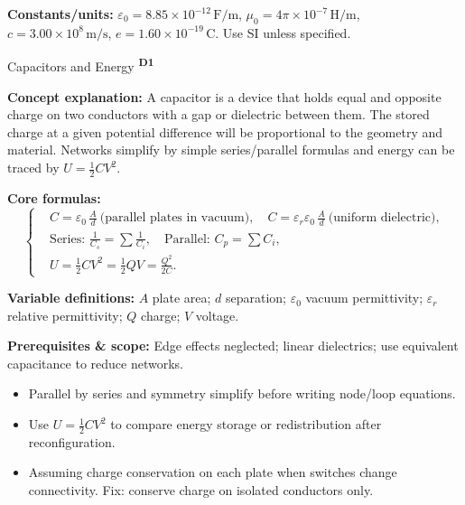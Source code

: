﻿\documentclass[12pt,a4paper]{article}
\providecommand{\KPFormulas}{}
\providecommand{\KPHeuristics}{}
\newcommand{\DOne}{\texorpdfstring{\textsuperscript{\textbf{D1}}}{ D1}}
\begin{document}
\begin{insightbox}
\textbf{Constants/units:} $\varepsilon_0=8.85\times10^{-12}\,\mathrm{F/m}$, $\mu_0=4\pi\times10^{-7}\,\mathrm{H/m}$, $c=3.00\times10^8\,\mathrm{m/s}$, $e=1.60\times10^{-19}\,\mathrm{C}$. Use SI unless specified.
\end{insightbox}


\begin{KnowledgePoint}{Capacitors and Energy \DOne}
  \KPFormulas
  \begin{formulabox}
  \textbf{Concept explanation:} A capacitor is a device that holds equal and opposite charge on two conductors with a gap or dielectric between them. The stored charge at a given potential difference will be proportional to the geometry and material. Networks simplify by simple series/parallel formulas and energy can be traced by $U=\tfrac12 C V^2$.

  \textbf{Core formulas:}
  \[
  \left\{\begin{aligned}
    &C=\varepsilon_0\,\frac{A}{d}\ \text{(parallel plates in vacuum)},\quad C=\varepsilon_r\varepsilon_0\,\frac{A}{d}\ \text{(uniform dielectric)},\\
    &\text{Series: } \frac{1}{C_s}=\sum \frac{1}{C_i},\quad \text{Parallel: } C_p=\sum C_i,\\
    &U=\tfrac12 C V^2=\tfrac12 QV=\frac{Q^2}{2C}.
  \end{aligned}\right.
  \]

  \textbf{Variable definitions:} $A$ plate area; $d$ separation; $\varepsilon_0$ vacuum permittivity; $\varepsilon_r$ relative permittivity; $Q$ charge; $V$ voltage.

  \textbf{Prerequisites \& scope:} Edge effects neglected; linear dielectrics; use equivalent capacitance to reduce networks.
  \end{formulabox}

  \KPHeuristics
  \begin{heuristicsbox}
  \begin{itemize}[leftmargin=*]
    \item Parallel by series and symmetry simplify before writing node/loop equations.
    \item Use $U=\tfrac12 CV^2$ to compare energy storage or redistribution after reconfiguration.
  \end{itemize}
  \vspace{0.4em}
  \begin{itemize}[leftmargin=*]
    \item Assuming charge conservation on each plate when switches change connectivity. Fix: conserve charge on isolated conductors only.
  \end{itemize}
  \end{heuristicsbox}


\end{KnowledgePoint}
\end{document}

